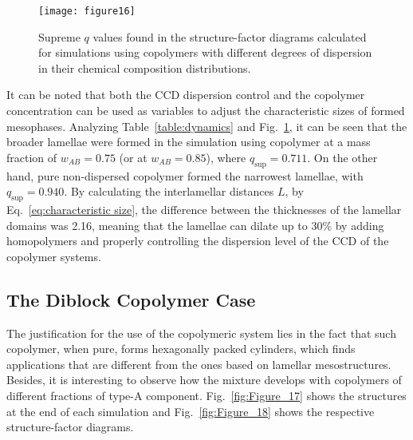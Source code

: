 \documentclass[
journal=mamobx,
manuscript=article,
]{achemso}
\begin{document}
\begin{figure}
	\centering
	\texttt{[image: figure16]}
	\caption{Supreme $q$ values found in the structure-factor diagrams calculated for simulations using copolymers with different degrees of dispersion in their chemical composition distributions.}
	\label{fig:Figure_16}
\end{figure}

It can be noted that both the CCD dispersion control and the copolymer concentration can be used as variables to adjust the characteristic sizes of formed mesophases.
Analyzing Table~\ref{table:dynamics} and Fig.~\ref{fig:Figure_16}, it can be seen that the broader lamellae were formed in the simulation using copolymer  at a mass fraction of $w_{AB}=0.75$ (or  at $w_{AB}=0.85$), where $q_\mathrm{sup}=0.711$.
On the other hand, pure  non-dispersed copolymer formed the narrowest lamellae, with $q_\mathrm{sup}=0.940$.
By calculating the interlamellar distances $L$, by Eq.~\eqref{eq:characteristic size}, the difference between the thicknesses of the lamellar domains was 2.16, meaning that the lamellae can dilate up to 30\% by adding homopolymers and properly controlling the dispersion level of the CCD of the copolymer systems.

\subsection{The  Diblock Copolymer Case}

The justification for the use of the  copolymeric system lies in the fact that such copolymer, when pure, forms hexagonally packed cylinders, which finds applications that are different from the ones based on lamellar mesostructures. Besides, it is interesting to observe how the mixture develops with copolymers of different fractions of type-A component.
Fig.~\ref{fig:Figure_17} shows the structures at the end of each simulation and Fig.~\ref{fig:Figure_18} shows the respective structure-factor diagrams. 
\end{document}
